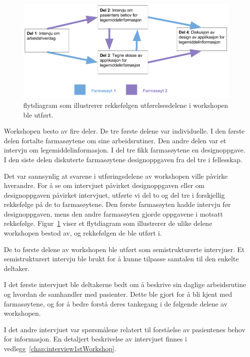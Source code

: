 \begin{figure}[H]
    \centering
    \includegraphics[width=1\textwidth]{fig/utviklingAvPrototype/1stWorkshop.png}
    \caption{flytdiagram som illustrerer rekkefølgen utførelsesdelene i workshopen ble utført.}
    \label{fig:1stWorkshop}
\end{figure}

Workshopen besto av fire deler. De tre første delene var individuelle. I den første delen fortalte farmasøytene om sine arbeidsrutiner. Den andre delen var et intervju om legemiddelinformasjon. I del tre fikk farmasøytene en designoppgave. I den siste delen diskuterte farmasøytene designoppgaven fra del tre i fellesskap. 

Det var sannsynlig at svarene i utføringsdelene av workshopen ville påvirke hverandre. For å se om intervjuet påvirket designoppgaven eller om designoppgaven påvirket intervjuet, utførte vi del to og del tre i forskjellig rekkefølge på de to farmasøytene. Den første farmasøyten hadde intervju før designoppgaven, mens den andre farmasøyten gjorde oppgavene i motsatt rekkefølge. Figur~\ref{fig:1stWorkshop} viser et flytdiagram som illustrerer de ulike delene workshopen bestod av, og rekkefølgen de ble utført i.

De to første delene av workshopen ble utført som semistrukturerte intervjuer. Et semistrukturert intervju ble brukt for å kunne tilpasse samtalen til den enkelte deltaker.

I det første intervjuet ble deltakerne bedt om å beskrive sin daglige arbeidsrutine og hvordan de samhandler med pasienter. Dette ble gjort for å bli kjent med farmasøytene, og for å bedre forstå deres tankegang i de følgende delene av workshopen. 

I det andre intervjuet var spørsmålene relatert til forståelse av pasientenes behov for informasjon. En detaljert beskrivelse av intervjuet finnes i vedlegg~\ref{chap:interview1stWorkshop}.


